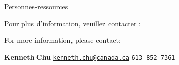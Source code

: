 

\begin{frame}{\vskip -0.1cm \huge Personnes-ressources}

\large

\begin{center}
\begin{multicols}{2}
	\begin{minipage}{4.5cm}
	\vskip -2.6cm
	\begin{center}
	Pour plus d'information,
	\vskip -0.01cm
	\noindent
	veuillez contacter :
	\end{center}
	\end{minipage}
\columnbreak
	\begin{minipage}{4.0cm}
	\vskip -2.5cm
	\begin{center}
	For more information,
	\vskip -0.01cm
	\noindent
	please contact\!:
	\end{center}
	\end{minipage}
\end{multicols}
\end{center}

\begin{center}
\vskip 0.5cm
\textbf{\huge Kenneth\;\,Chu}
\vskip 0.15cm
\href{mailto:kenneth.chu@canada.ca}{\Large\color{darkBlue}\underline{\texttt{kenneth.chu@canada.ca}}}
\vskip 0.24cm
\texttt{\Large 613-852-7361}
\end{center}
%
\end{frame}

%
%
%
%
